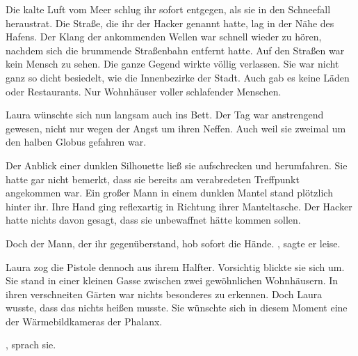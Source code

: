 \par

Die kalte Luft vom Meer schlug ihr sofort entgegen, als sie in den Schneefall heraustrat. Die Straße, die ihr der Hacker genannt hatte, lag in der Nähe des Hafens. Der Klang der ankommenden Wellen war schnell wieder zu hören, nachdem sich die brummende Straßenbahn entfernt hatte. Auf den Straßen war kein Mensch zu sehen. Die ganze Gegend wirkte völlig verlassen. Sie war nicht ganz so dicht besiedelt, wie die Innenbezirke der Stadt. Auch gab es keine Läden oder Restaurants. Nur Wohnhäuser voller schlafender Menschen.

\par

Laura wünschte sich nun langsam auch ins Bett. Der Tag war anstrengend gewesen, nicht nur wegen der Angst um ihren Neffen. Auch weil sie zweimal um den halben Globus gefahren war.

\par

Der Anblick einer dunklen Silhouette ließ sie aufschrecken und herumfahren. Sie hatte gar nicht bemerkt, dass sie bereits am verabredeten Treffpunkt angekommen war. Ein großer Mann in einem dunklen Mantel stand plötzlich hinter ihr. Ihre Hand ging reflexartig in Richtung ihrer Manteltasche. Der Hacker hatte nichts davon gesagt, dass sie unbewaffnet hätte kommen sollen.

\par

Doch der Mann, der ihr gegenüberstand, hob sofort die Hände. , sagte er leise.

\par

Laura zog die Pistole dennoch aus ihrem Halfter. Vorsichtig blickte sie sich um. Sie stand in einer kleinen Gasse zwischen zwei gewöhnlichen Wohnhäusern. In ihren verschneiten Gärten war nichts besonderes zu erkennen. Doch Laura wusste, dass das nichts heißen musste. Sie wünschte sich in diesem Moment eine der Wärmebildkameras der Phalanx.

\par

, sprach sie. 

\par

